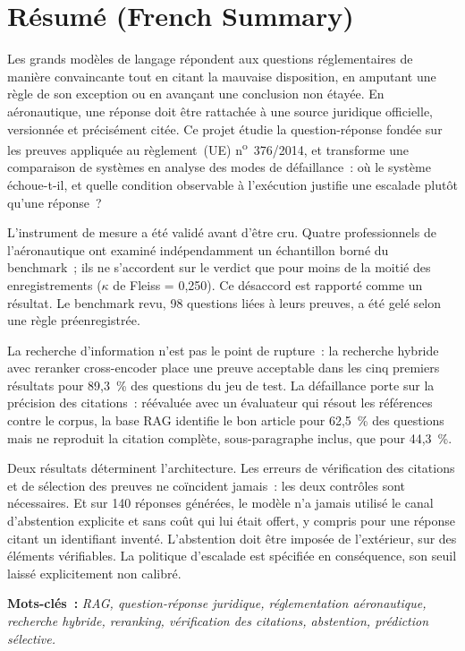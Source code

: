 \chapter*{R\'{e}sum\'{e} (French Summary)}

Les grands mod\`{e}les de langage r\'{e}pondent aux questions r\'{e}glementaires
de mani\`{e}re convaincante tout en citant la mauvaise disposition, en amputant
une r\`{e}gle de son exception ou en avan\c{c}ant une conclusion non
\'{e}tay\'{e}e. En a\'{e}ronautique, une r\'{e}ponse doit \^{e}tre
rattach\'{e}e \`{a} une source juridique officielle, versionn\'{e}e et
pr\'{e}cis\'{e}ment cit\'{e}e. Ce projet \'{e}tudie la question-r\'{e}ponse
fond\'{e}e sur les preuves appliqu\'{e}e au r\`{e}glement~(UE)
n\textsuperscript{o}~376/2014, et transforme une comparaison de syst\`{e}mes en
analyse des modes de d\'{e}faillance~: o\`{u} le syst\`{e}me \'{e}choue-t-il,
et quelle condition observable \`{a} l'ex\'{e}cution justifie une escalade
plut\^{o}t qu'une r\'{e}ponse~?

L'instrument de mesure a \'{e}t\'{e} valid\'{e} avant d'\^{e}tre cru. Quatre
professionnels de l'a\'{e}ronautique ont examin\'{e} ind\'{e}pendamment un
\'{e}chantillon born\'{e} du benchmark~; ils ne s'accordent sur le verdict que
pour moins de la moiti\'{e} des enregistrements ($\kappa$ de Fleiss = 0,250). Ce
d\'{e}saccord est rapport\'{e} comme un r\'{e}sultat. Le benchmark revu, 98
questions li\'{e}es \`{a} leurs preuves, a \'{e}t\'{e} gel\'{e} selon une
r\`{e}gle pr\'{e}enregistr\'{e}e.

La recherche d'information n'est pas le point de rupture~: la recherche hybride
avec reranker cross-encoder place une preuve acceptable dans les cinq
premiers r\'{e}sultats pour 89,3~\% des questions du jeu de test. La
d\'{e}faillance porte sur la pr\'{e}cision des citations~: r\'{e}\'{e}valu\'{e}e
avec un \'{e}valuateur qui r\'{e}sout les r\'{e}f\'{e}rences contre le corpus, la
base RAG identifie le bon article pour 62,5~\% des questions mais ne reproduit la
citation compl\`{e}te, sous-paragraphe inclus, que pour 44,3~\%.

Deux r\'{e}sultats d\'{e}terminent l'architecture. Les erreurs de
v\'{e}rification des citations et de s\'{e}lection des preuves ne
co\"{i}ncident jamais~: les deux contr\^{o}les sont n\'{e}cessaires. Et sur 140
r\'{e}ponses g\'{e}n\'{e}r\'{e}es, le mod\`{e}le n'a jamais utilis\'{e} le canal
d'abstention explicite et sans co\^{u}t qui lui \'{e}tait offert, y compris pour
une r\'{e}ponse citant un identifiant invent\'{e}. L'abstention doit \^{e}tre
impos\'{e}e de l'ext\'{e}rieur, sur des \'{e}l\'{e}ments v\'{e}rifiables. La
politique d'escalade est sp\'{e}cifi\'{e}e en cons\'{e}quence, son seuil
laiss\'{e} explicitement non calibr\'{e}.

\medskip
\noindent\textbf{\color{aivancityNavy}Mots-cl\'{e}s~:}
\textit{\color{aivancityGray}RAG, question-r\'{e}ponse juridique, r\'{e}glementation a\'{e}ronautique, recherche hybride, reranking, v\'{e}rification des citations, abstention, pr\'{e}diction s\'{e}lective.}
